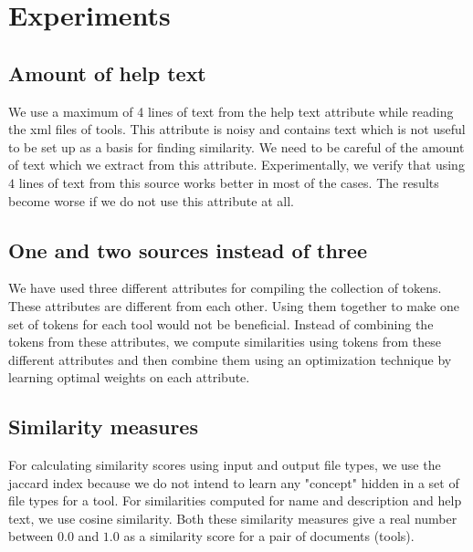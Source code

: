 \chapter{Experiments}
\section{Amount of help text}
We use a maximum of 4 lines of text from the help text attribute while reading the xml files of tools. This attribute is noisy and contains text which is not useful to be set up as a basis for finding similarity. We need to be careful of the amount of text which we extract from this attribute. Experimentally, we verify that using $4$ lines of text from this source works better in most of the cases. The results become worse if we do not use this attribute at all.

\section{One and two sources instead of three}
We have used three different attributes for compiling the collection of tokens. These attributes are different from each other. Using them together to make one set of tokens for each tool would not be beneficial. Instead of combining the tokens from these attributes, we compute similarities using tokens from these different attributes and then combine them using an optimization technique by learning optimal weights on each attribute.

\section{Similarity measures}
For calculating similarity scores using input and output file types, we use the jaccard index because we do not intend to learn any "concept" hidden in a set of file types for a tool. For similarities computed for name and description and help text, we use cosine similarity. Both these similarity measures give a real number between $0.0$ and $1.0$ as a similarity score for a pair of documents (tools).

